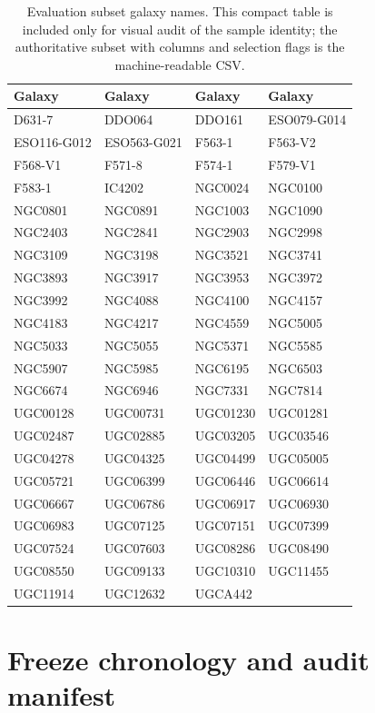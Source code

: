 \documentclass[aps,prd,preprint,nofootinbib,superscriptaddress]{revtex4-2}
\providecommand{\FloatBarrier}{\clearpage}
\begin{document}
\begin{table}[p]
\centering
\scriptsize
\caption{Evaluation subset galaxy names. This compact table is included only for visual audit of the sample identity; the authoritative subset with columns and selection flags is the machine-readable CSV.}
\label{tab:evaluation-subset-names}
\begin{tabular}{llll}
\toprule
Galaxy & Galaxy & Galaxy & Galaxy \\
\midrule
D631-7 & DDO064 & DDO161 & ESO079-G014 \\
ESO116-G012 & ESO563-G021 & F563-1 & F563-V2 \\
F568-V1 & F571-8 & F574-1 & F579-V1 \\
F583-1 & IC4202 & NGC0024 & NGC0100 \\
NGC0801 & NGC0891 & NGC1003 & NGC1090 \\
NGC2403 & NGC2841 & NGC2903 & NGC2998 \\
NGC3109 & NGC3198 & NGC3521 & NGC3741 \\
NGC3893 & NGC3917 & NGC3953 & NGC3972 \\
NGC3992 & NGC4088 & NGC4100 & NGC4157 \\
NGC4183 & NGC4217 & NGC4559 & NGC5005 \\
NGC5033 & NGC5055 & NGC5371 & NGC5585 \\
NGC5907 & NGC5985 & NGC6195 & NGC6503 \\
NGC6674 & NGC6946 & NGC7331 & NGC7814 \\
UGC00128 & UGC00731 & UGC01230 & UGC01281 \\
UGC02487 & UGC02885 & UGC03205 & UGC03546 \\
UGC04278 & UGC04325 & UGC04499 & UGC05005 \\
UGC05721 & UGC06399 & UGC06446 & UGC06614 \\
UGC06667 & UGC06786 & UGC06917 & UGC06930 \\
UGC06983 & UGC07125 & UGC07151 & UGC07399 \\
UGC07524 & UGC07603 & UGC08286 & UGC08490 \\
UGC08550 & UGC09133 & UGC10310 & UGC11455 \\
UGC11914 & UGC12632 & UGCA442 &  \\
\bottomrule
\end{tabular}
\end{table}

\FloatBarrier



\clearpage
\FloatBarrier
\section{Freeze chronology and audit manifest}
\end{document}
